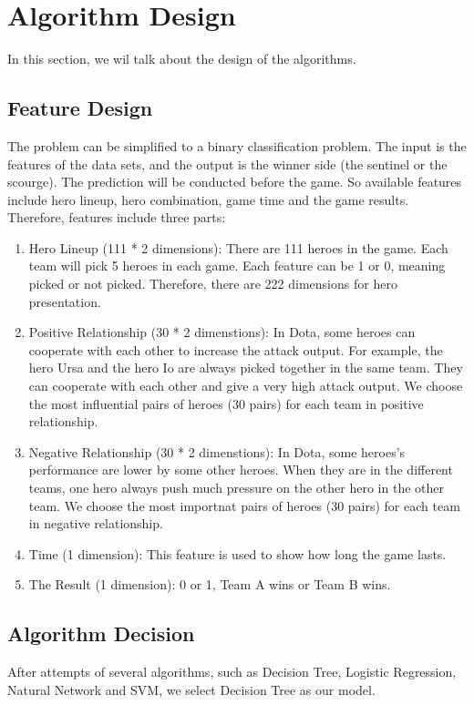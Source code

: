 \section{Algorithm Design}
In this section, we wil talk about the design of the algorithms.
\subsection{Feature Design}
The problem can be simplified to a binary classification problem.
The input is the features of the data sets, and the output is the winner side (the sentinel or the scourge).
The prediction will be conducted before the game.
So available features include hero lineup, hero combination, game time and the game results.
Therefore, features include three parts: 
\begin{enumerate}
\item Hero Lineup (111 * 2 dimensions): There are 111 heroes in the game.
Each team will pick 5 heroes in each game.
Each feature can be 1 or 0, meaning picked or not picked.
Therefore, there are 222 dimensions for hero presentation.
\item Positive Relationship (30 * 2 dimenstions):
In Dota, some heroes can cooperate with each other to increase the attack output.
For example, the hero Ursa and the hero Io are always picked together in the same team.
They can cooperate with each other and give a very high attack output.
We choose the most influential pairs of heroes (30 pairs) for each team in positive relationship.
\item Negative Relationship (30 * 2 dimenstions):
In Dota, some heroes's performance are lower by some other heroes.
When they are in the different teams, one hero always push much pressure on the other hero in the other team.
We choose the most importnat pairs of heroes (30 pairs) for each team in negative relationship.
\item Time (1 dimension):
This feature is used to show how long the game lasts.
\item The Result (1 dimension): 0 or 1, Team A wins or Team B wins.
\end{enumerate}
\subsection{Algorithm Decision}

After attempts of several algorithms, such as Decision Tree, Logistic Regression, Natural Network and SVM, we select Decision Tree as our model.
 

